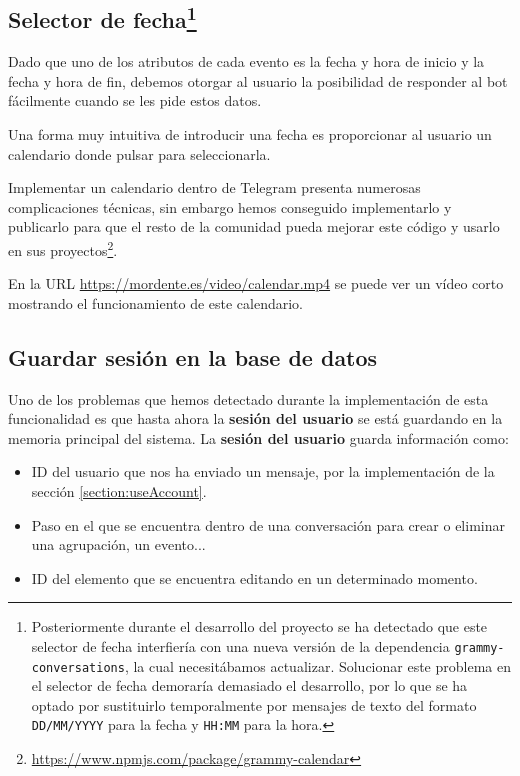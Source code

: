 \subsection{Selector de fecha\footnote{Posteriormente durante el desarrollo del proyecto se ha detectado que este selector de fecha interfiería con una nueva versión de la dependencia \texttt{grammy-conversations}, la cual necesitábamos actualizar. Solucionar este problema en el selector de fecha demoraría demasiado el desarrollo, por lo que se ha optado por sustituirlo temporalmente por mensajes de texto del formato \texttt{DD/MM/YYYY} para la fecha y \texttt{HH:MM} para la hora.}}

Dado que uno de los atributos de cada evento es la fecha y hora de inicio y la fecha y hora de fin, debemos otorgar al usuario la posibilidad de responder al bot fácilmente cuando se les pide estos datos.

Una forma muy intuitiva de introducir una fecha es proporcionar al usuario un calendario donde pulsar para seleccionarla.

Implementar un calendario dentro de Telegram presenta numerosas complicaciones técnicas, sin embargo hemos conseguido implementarlo y publicarlo para que el resto de la comunidad pueda mejorar este código y usarlo en sus proyectos\footnote{\url{https://www.npmjs.com/package/grammy-calendar}}.

En la URL \url{https://mordente.es/video/calendar.mp4} se puede ver un vídeo corto mostrando el funcionamiento de este calendario.

\subsection{Guardar sesión en la base de datos}\label{subsection:adaptadorPrisma}


Uno de los problemas que hemos detectado durante la implementación de esta funcionalidad es que hasta ahora la \textbf{sesión del usuario} se está guardando en la memoria principal del sistema. La \textbf{sesión del usuario} guarda información como:

\begin{itemize}
    \item ID del usuario que nos ha enviado un mensaje, por la implementación de la sección \ref{section:useAccount}.
    \item Paso en el que se encuentra dentro de una conversación para crear o eliminar una agrupación, un evento...
    \item ID del elemento que se encuentra editando en un determinado momento.
\end{itemize}

